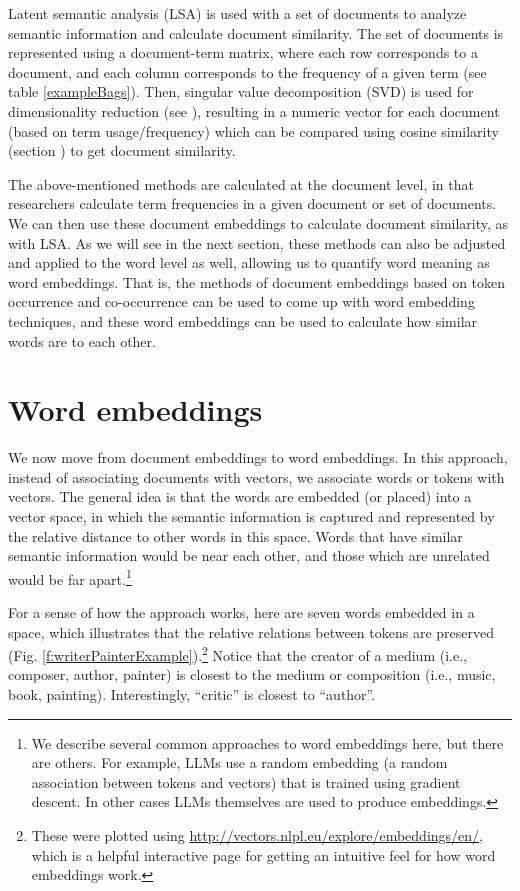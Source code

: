 Latent semantic analysis (LSA) is used with a set of documents to analyze semantic information and calculate document similarity. The set of documents is represented using a document-term matrix, where each row corresponds to a document, and each column corresponds to the frequency of a given term (see table \ref{exampleBags}). Then, singular value decomposition (SVD) is used for dimensionality reduction (see ), resulting in a numeric vector for each document (based on term usage/frequency) which can be compared using cosine similarity (section ) to get document similarity.

The above-mentioned methods are calculated at the document level, in that researchers calculate term frequencies in a given document or set of documents. We can then use these document embeddings to calculate document similarity, as with LSA. As we will see in the next section, these methods can also be adjusted and applied to the word level as well, allowing us to quantify word meaning as word embeddings. That is, the methods of document embeddings based on token occurrence and co-occurrence can be used to come up with word embedding techniques, and these word embeddings can be used to calculate how similar words are to each other.

\section{Word embeddings}

We now move from document embeddings to word embeddings. In this approach, instead of associating documents with vectors, we associate words or tokens with vectors. 
The general idea is that the words are embedded (or placed) into a vector space, in which the semantic information is captured and represented by the relative distance to other words in this space. Words that have similar semantic information would be near each other, and those which are unrelated would be far apart.\footnote{We describe several common approaches to word embeddings here, but there are others. For example, LLMs use a random embedding (a random association between tokens and vectors) that is trained using gradient descent. In other cases LLMs themselves are used to produce embeddings.}

For a sense of how the approach works, here are seven words embedded in a space, which illustrates that the relative relations between tokens are preserved (Fig. \ref{f:writerPainterExample}).\footnote{These were plotted using \url{http://vectors.nlpl.eu/explore/embeddings/en/}, which is a helpful interactive page for getting an intuitive feel for how word embeddings work.}  Notice that the creator of a medium (i.e., composer, author, painter) is closest to the medium or composition (i.e., music, book, painting). Interestingly, ``critic'' is closest to ``author''.

